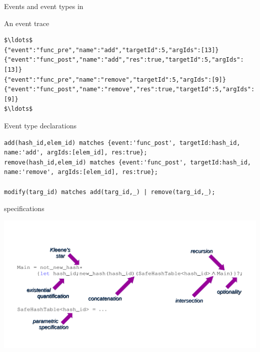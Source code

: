 \documentclass[10pt,usenames,dvipsnames]{beamer}
\begin{document}
\begin{frame}[fragile]{Events and event types in \rml}
  \begin{block}{An event trace}
    \begin{lstlisting}[basicstyle=\ttfamily\scriptsize]
$\ldots$
{"event":"func_pre","name":"add","targetId":5,"argIds":[13]}      
{"event":"func_post","name":"add","res":true,"targetId":5,"argIds":[13]}
{"event":"func_pre","name":"remove","targetId":5,"argIds":[9]}
{"event":"func_post","name":"remove","res":true,"targetId":5,"argIds":[9]}
$\ldots$
    \end{lstlisting}
  \end{block}

  \begin{block}{Event type declarations}
    \begin{lstlisting}[basicstyle=\ttfamily\scriptsize]
add(hash_id,elem_id) matches {event:'func_post', targetId:hash_id, name:'add', argIds:[elem_id], res:true};
remove(hash_id,elem_id) matches {event:'func_post', targetId:hash_id, name:'remove', argIds:[elem_id], res:true};

modify(targ_id) matches add(targ_id,_) | remove(targ_id,_);
    \end{lstlisting}
  \end{block}
\end{frame}

\begin{frame}[fragile]{\rml specifications}
  \begin{center}
    \includegraphics[keepaspectratio,width=1.4\textheight]{images/RMLfragAnnot2}
  \end{center}











\end{frame}
\end{document}
